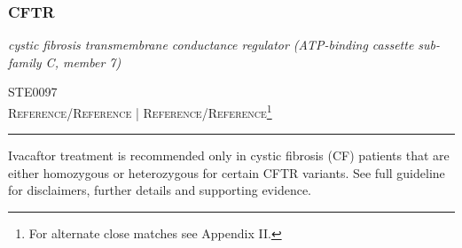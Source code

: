 \documentclass{report}
\begin{document}
\subsubsection{ CFTR }
     \textit{ cystic fibrosis transmembrane conductance regulator (ATP-binding cassette sub-family C, member 7) } \begin{flushright} \textsc{ STE0097 \\ Reference/Reference  | Reference/Reference\footnote{For alternate close matches see Appendix II.} }\end{flushright}
      \hrule \vspace{6pt}
      Ivacaftor treatment is recommended only in cystic fibrosis (CF) patients that are either homozygous or heterozygous for certain CFTR variants.  See full guideline for disclaimers, further details and supporting evidence. \newline
      \scriptsize
\end{document}
